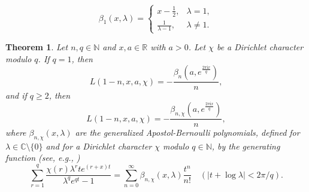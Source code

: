 \documentclass[10pt,a4paper]{amsart}
\newtheorem{theorem}{Theorem}
\begin{document}
\begin{equation}\label{eq2.11}
\beta_{1}(x,\lambda)=\begin{cases}
x-\frac{1}{2},  &\lambda=1,\\
\frac{1}{\lambda-1},  &\lambda\not=1.
\end{cases}
\end{equation}

\begin{theorem}\label{thm2.6} Let $n,q\in\mathbb{N}$ and $x,a\in\mathbb{R}$ with $a>0$. Let $\chi$ be a Dirichlet character modulo $q$. If $q=1$, then
\begin{equation}\label{eq2.15}
L(1-n,x,a,\chi)=-\frac{\beta_{n}(a,e^{\frac{2\pi \mathrm{i}x}{q}})}{n},
\end{equation}
and if $q\geqslant2$, then
\begin{equation}\label{eq2.16}
L(1-n,x,a,\chi)=-\frac{\beta_{n,\chi}(a,e^{\frac{2\pi \mathrm{i}x}{q}})}{n},
\end{equation}
where $\beta_{n,\chi}(x,\lambda)$ are the generalized Apostol-Bernoulli polynomials, defined for $\lambda\in\mathbb{C}\setminus\{0\}$ and for a Dirichlet character $\chi$ modulo $q\in\mathbb{N}$, by the generating function (see, e.g., \cite[Definition 2.1]{he})
\begin{equation}\label{eq2.17}
\sum_{r=1}^{q}\frac{\chi(r)\lambda^{r}te^{(r+x)t}}{\lambda^{q}e^{qt}-1}=\sum_{n=0}^{\infty}\beta_{n,\chi}(x,\lambda)\frac{t^{n}}{n!}\quad(|t+\log\lambda|<2\pi/q).
\end{equation}
\end{theorem}
\end{document}
